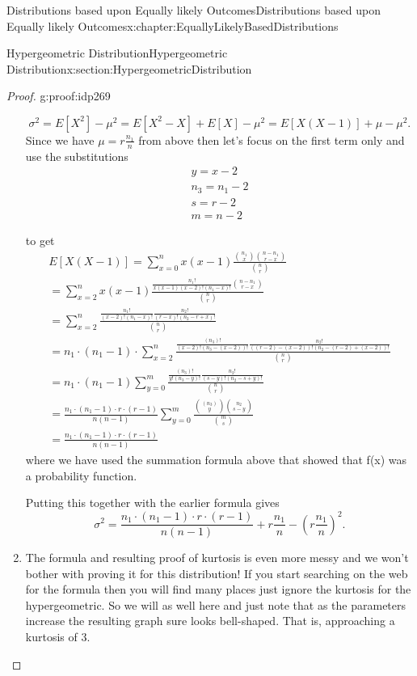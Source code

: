 \documentclass[oneside,10pt,]{book}
\numberwithin{equation}{section}
\begin{document}
\begin{chapterptx}{Distributions based upon Equally likely Outcomes}{}{Distributions based upon Equally likely Outcomes}{}{}{x:chapter:EquallyLikelyBasedDistributions}
\begin{sectionptx}{Hypergeometric Distribution}{}{Hypergeometric Distribution}{}{}{x:section:HypergeometricDistribution}
\begin{proof}{}{g:proof:idp269}
\begin{enumerate}
\begin{equation*}
\sigma^2 = E[X^2] - \mu^2 = E[X^2-X]+E[X] -\mu^2 = E[X(X-1)] + \mu - \mu^2.
\end{equation*}
Since we have \(\mu = r \frac{n_1}{n}\) from above then let's focus on the first term only and use the substitutions%
\begin{gather*}
y = x-2\\
n_3 = n_1-2\\
s = r-2\\
m = n-2
\end{gather*}
%
\par
to get%
\begin{gather*}
E[X(X-1)] = \sum_{x=0}^n x(x-1) \frac{\binom{n_1}{x} \binom{n-n_1}{r-x}}{\binom{n}{r}}\\
= \sum_{x=2}^n x(x-1) \frac{\frac{n_1!}{x(x-1)(x-2)!(n_1-x)! } \binom{n-n_1}{r-x}}{\binom{n}{r}}\\
= \sum_{x=2}^n \frac{\frac{n_1!}{(x-2)!(n_1-x)! } \frac{n_2!}{(r-x)!(n_2-r+x)!}}{\binom{n}{r}}\\
= n_1 \cdot (n_1-1) \cdot  
\sum_{x=2}^n \frac{\frac{(n_3)!}{(x-2)!(n_3 -(x-2))! } \frac{n_2!}{((r-2)-(x-2))!(n_2-(r-2)+(x-2))!}}{\binom{n}{r}}\\
= n_1 \cdot (n_1-1) \sum_{y=0}^{m} \frac{\frac{(n_3)!}{y!(n_3 -y)! } \frac{n_2!}{(s-y)!(n_2-s+y)!}}{\binom{n}{r}}\\
= \frac{n_1 \cdot (n_1-1) \cdot r \cdot (r-1)}{n (n-1)} \sum_{y=0}^{m} \frac{\binom{(n_3)}{y} \binom{n_2}{s-y}}{\binom{m}{s}}\\
= \frac{n_1 \cdot (n_1-1) \cdot r \cdot (r-1)}{n (n-1)} 
\end{gather*}
where we have used the summation formula above that showed that f(x) was a probability function.%
\par
Putting this together with the earlier formula gives%
\begin{equation*}
\sigma^2 = \frac{n_1 \cdot (n_1-1) \cdot r \cdot (r-1)}{n (n-1)} + r \frac{n_1}{n} - \left ( r \frac{n_1}{n} \right )^2.
\end{equation*}
%
\item{}The formula and resulting proof of kurtosis is even more messy and we won’t bother with proving it for this distribution! If you start searching on the web for the formula then you will find many places just ignore the kurtosis for the hypergeometric.  So we will as well here and just note that as the parameters increase the resulting graph sure looks bell-shaped.  That is, approaching a kurtosis of 3.%

\end{enumerate}
\end{proof}
\end{sectionptx}
\end{chapterptx}
\end{document}

